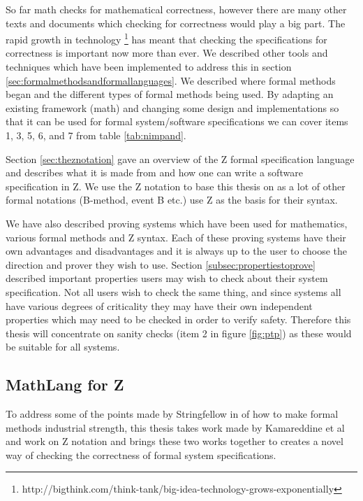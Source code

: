 So far \gls{math} checks for mathematical correctness, however there are many
other texts and documents which checking for correctness would play a big part.
The rapid growth in technology
\footnote{http://bigthink.com/think-tank/big-idea-technology-grows-exponentially}
has meant that checking the specifications for
correctness is important now more than ever. We described other tools and
techniques which have been implemented to address this in section
\ref{sec:formalmethodsandformallanguages}.  We described where formal methods
began and the different types of formal methods being used. By adapting an existing
framework (\gls{math}) and changing some design and implementations so that it
can be used for formal system/software specifications we can cover items 1, 3,
5, 6, and 7 from table \ref{tab:nimpand}.

Section \ref{sec:theznotation} gave an overview of the Z formal specification
language and describes what it is made from and how one can write a software
specification in Z. We use the Z notation to base this thesis on as a lot of
other formal notations (B-method, event B etc.) use Z as the basis for their
syntax.

We have also described proving systems which have been used for mathematics,
various formal methods and Z syntax. Each of these proving systems have their
own advantages and disadvantages and it is always up to the user to choose the
direction and prover they wish to use. Section \ref{subsec:propertiestoprove}
described important properties users may wish to check about their system
specification. Not all users wish to check the same thing, and since  systems
all have various degrees of criticality they may have their own independent
properties which may need to be checked in order to verify safety. Therefore
this thesis will concentrate on sanity checks (item 2 in figure \ref{fig:ptp})
as these would be suitable for all systems.

\subsection{MathLang for Z}

To address some of the points made by Stringfellow in \cite{fmpresetation} of
how to make formal methods industrial strength, this thesis takes work made by
Kamareddine et al \cite{newmathlang} and work on Z notation
\cite{spiveyreferencemanual} and brings these two works together to creates a
novel way of checking the correctness of formal system specifications.

